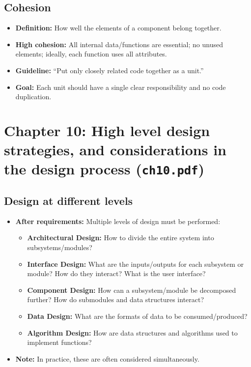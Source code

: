 \documentclass[11pt,a4paper]{article}
\begin{document}
\subsection*{Cohesion}
\begin{itemize}
    \item \textbf{Definition:} How well the elements of a component belong together.
    \item \textbf{High cohesion:} All internal data/functions are essential; no unused elements; ideally, each function uses all attributes.
    \item \textbf{Guideline:} ``Put only closely related code together as a unit.''
    \item \textbf{Goal:} Each unit should have a single clear responsibility and no code duplication.
\end{itemize}

\section{Chapter 10: High level design strategies, and considerations in the design process (\texttt{ch10.pdf})}

\subsection*{Design at different levels}
\begin{itemize}
    \item \textbf{After requirements:} Multiple levels of design must be performed:
        \begin{itemize}
            \item \textbf{Architectural Design:} How to divide the entire system into subsystems/modules?
            \item \textbf{Interface Design:} What are the inputs/outputs for each subsystem or module? How do they interact? What is the user interface?
            \item \textbf{Component Design:} How can a subsystem/module be decomposed further? How do submodules and data structures interact?
            \item \textbf{Data Design:} What are the formats of data to be consumed/produced?
            \item \textbf{Algorithm Design:} How are data structures and algorithms used to implement functions?
        \end{itemize}
    \item \textbf{Note:} In practice, these are often considered simultaneously.
\end{itemize}
\end{document}
